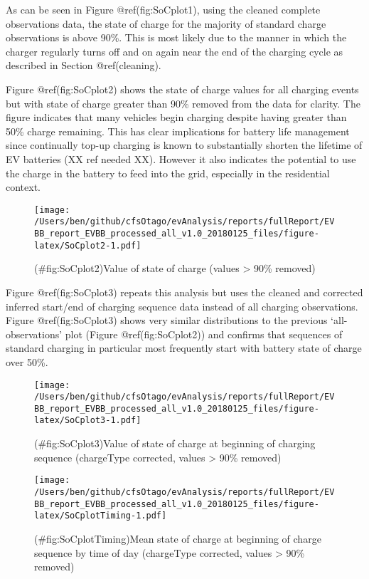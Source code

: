\documentclass[]{article}
\begin{document}
As can be seen in Figure @ref(fig:SoCplot1), using the cleaned complete observations data, the state of charge for the majority of standard charge observations is above 90\%. This is most likely due to the manner in which the charger regularly turns off and on again near the end of the charging cycle as described in Section @ref(cleaning).

Figure @ref(fig:SoCplot2) shows the state of charge values for all charging events but with state of charge greater than 90\% removed from the data for clarity. The figure indicates that many vehicles begin charging despite having greater than 50\% charge remaining. This has clear implications for battery life management since continually top-up charging is known to substantially shorten the lifetime of EV batteries (XX ref needed XX). However it also indicates the potential to use the charge in the battery to feed into the grid, especially in the residential context.

\begin{figure}
\centering
\texttt{[image: /Users/ben/github/cfsOtago/evAnalysis/reports/fullReport/EVBB\_report\_EVBB\_processed\_all\_v1.0\_20180125\_files/figure-latex/SoCplot2-1.pdf]}
\caption{(\#fig:SoCplot2)Value of state of charge (values \textgreater{} 90\% removed)}
\end{figure}

Figure @ref(fig:SoCplot3) repeats this analysis but uses the cleaned and corrected inferred start/end of charging sequence data instead of all charging observations. Figure @ref(fig:SoCplot3) shows very similar distributions to the previous `all-observations' plot (Figure @ref(fig:SoCplot2)) and confirms that sequences of standard charging in particular most frequently start with battery state of charge over 50\%.

\begin{figure}
\centering
\texttt{[image: /Users/ben/github/cfsOtago/evAnalysis/reports/fullReport/EVBB\_report\_EVBB\_processed\_all\_v1.0\_20180125\_files/figure-latex/SoCplot3-1.pdf]}
\caption{(\#fig:SoCplot3)Value of state of charge at beginning of charging sequence (chargeType corrected, values \textgreater{} 90\% removed)}
\end{figure}

\begin{figure}
\centering
\texttt{[image: /Users/ben/github/cfsOtago/evAnalysis/reports/fullReport/EVBB\_report\_EVBB\_processed\_all\_v1.0\_20180125\_files/figure-latex/SoCplotTiming-1.pdf]}
\caption{(\#fig:SoCplotTiming)Mean state of charge at beginning of charge sequence by time of day (chargeType corrected, values \textgreater{} 90\% removed)}
\end{figure}
\end{document}
